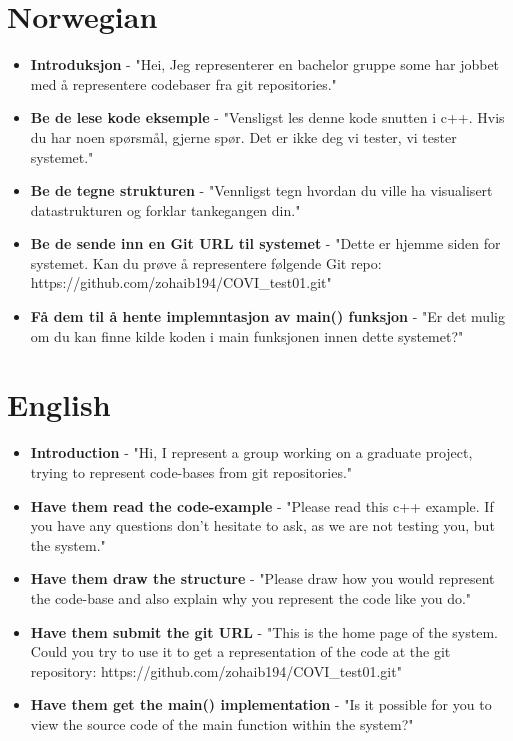 \section*{Norwegian}

\begin{itemize}
    \item \textbf{Introduksjon} - "Hei, Jeg representerer en bachelor gruppe some har jobbet med å representere codebaser fra git repositories."
    \item \textbf{Be de lese kode eksemple} - "Vensligst les denne kode snutten i c++. Hvis du har noen spørsmål, gjerne spør. Det er ikke deg vi tester, vi tester systemet."
    \item \textbf{Be de tegne strukturen} - "Vennligst tegn hvordan du ville ha visualisert datastrukturen og forklar tankegangen din."
    \item \textbf{Be de sende inn en Git URL til systemet} - "Dette er hjemme siden for systemet. Kan du prøve å representere følgende Git repo: https://github.com/zohaib194/COVI\_test01.git"
    \item \textbf{Få dem til å hente implemntasjon av main() funksjon} - "Er det mulig om du kan finne kilde koden i main funksjonen innen dette systemet?"
\end{itemize}

\section*{English}

\begin{itemize}
    \item \textbf{Introduction} - "Hi, I represent a group working on a graduate project, trying to represent code-bases from git repositories."
    \item \textbf{Have them read the code-example} - "Please read this c++ example. If you have any questions don't hesitate to ask, as we are not testing you, but the system."
    \item \textbf{Have them draw the structure} - "Please draw how you would represent the code-base and also explain why you represent the code like you do."
    \item \textbf{Have them submit the git URL} - "This is the home page of the system. Could you try to use it to get a representation of the code at the git repository: https://github.com/zohaib194/COVI\_test01.git" 
    \item \textbf{Have them get the main() implementation} - "Is it possible for you to view the source code of the main function within the system?"
\end{itemize}